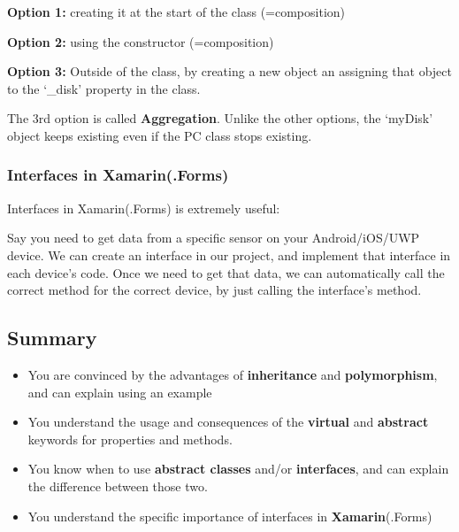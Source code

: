 \documentclass{article}
\newcommand{\bold}[1]{\textbf{#1}}
\begin{document}
\bold{Option 1:} creating it at the start of the class (=composition)

\bold{Option 2:} using the constructor (=composition)

\bold{Option 3:} Outside of the class, by creating a new object an assigning that object to the `\_disk' property in the class.

The 3rd option is called \bold{Aggregation}. Unlike the other options, the `myDisk' object keeps existing even if the PC class stops existing.

\subsubsection{Interfaces in Xamarin(.Forms)}

Interfaces in Xamarin(.Forms) is extremely useful: 

Say you need to get data from a specific sensor on your Android/iOS/UWP device. 
We can create an interface in our project, and implement that interface in each device's code.
Once we need to get that data, we can automatically call the correct method for the correct device,
by just calling the interface's method.

\subsection{Summary}

\begin{itemize}
    \item You are convinced by the advantages of \bold{inheritance} and \bold{polymorphism}, and can explain using an example
    \item  You understand the usage and consequences of the \bold{virtual} and \bold{abstract} keywords for properties and methods.
    \item  You know when to use \bold{abstract classes} and/or \bold{interfaces}, and can explain the difference between those two.
    \item  You understand the specific importance of interfaces in \bold{Xamarin}(.Forms)
\end{itemize}
\end{document}
